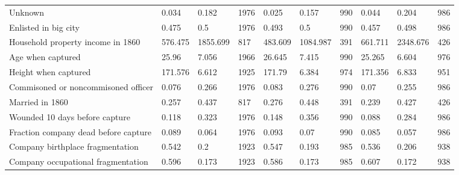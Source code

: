 \documentclass[draft.tex]{subfiles}
\begin{document}
\begin{table}
\begin{tabular}{llllllllll}
Unknown                           & 0.034                   & 0.182                                & 1976                                   & 0.025 & 0.157 & 990 & 0.044 & 0.204 & 986 \\
Enlisted in big city              & 0.475                   & 0.5                                  & 1976                                   & 0.493 & 0.5 & 990 & 0.457 & 0.498 & 986 \\
Household property income in 1860 & 576.475                 & 1855.699                             & 817                                    & 483.609 & 1084.987 & 391 & 661.711 & 2348.676 & 426 \\
Age when captured                 & 25.96                   & 7.056                                & 1966                                   & 26.645 & 7.415 & 990 & 25.265 & 6.604 & 976 \\
Height when captured                 & 171.576 & 6.612 & 1925 & 171.79 & 6.384 & 974 & 171.356 & 6.833 & 951 \\
Commisoned or noncommisoned officer  & 0.076   & 0.266 & 1976 & 0.083  & 0.276 & 990 & 0.07    & 0.255 & 986 \\
Married in 1860                      & 0.257   & 0.437 & 817  & 0.276  & 0.448 & 391 & 0.239   & 0.427 & 426 \\
Wounded 10 days before capture       & 0.118   & 0.323 & 1976 & 0.148  & 0.356 & 990 & 0.088   & 0.284 & 986 \\
Fraction company dead before capture & 0.089   & 0.064 & 1976 & 0.093  & 0.07  & 990 & 0.085   & 0.057 & 986 \\
Company birthplace fragmentation     & 0.542   & 0.2   & 1923 & 0.547  & 0.193 & 985 & 0.536   & 0.206 & 938 \\
Company occupational fragmentation   & 0.596   & 0.173 & 1923 & 0.586  & 0.173 & 985 & 0.607   & 0.172 & 938 \\
\end{tabular}
\end{table}
\end{document}
